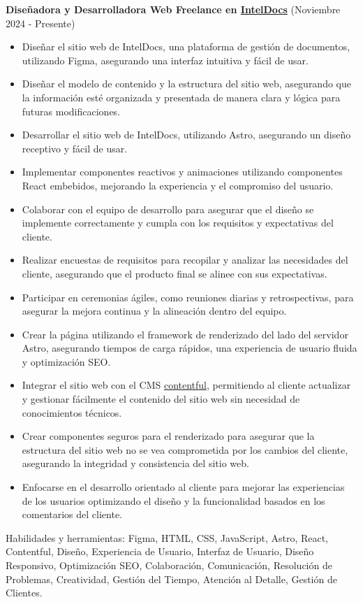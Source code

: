 \vspace*{0.2cm}
\textbf{Diseñadora y Desarrolladora Web Freelance en \href{}{IntelDocs}} (Noviembre 2024 - Presente)
\hfill
\vspace*{0.2cm}
\begin{minipage}{\linewidth}
\begin{itemize}[noitemsep]
    \item Diseñar el sitio web de IntelDocs, una plataforma de gestión de documentos, utilizando Figma, asegurando una interfaz intuitiva y fácil de usar.
    \item Diseñar el modelo de contenido y la estructura del sitio web, asegurando que la información esté organizada y presentada de manera clara y lógica para futuras modificaciones.
    \item Desarrollar el sitio web de IntelDocs, utilizando Astro, asegurando un diseño receptivo y fácil de usar.
    \item Implementar componentes reactivos y animaciones utilizando componentes React embebidos, mejorando la experiencia y el compromiso del usuario.
    \item Colaborar con el equipo de desarrollo para asegurar que el diseño se implemente correctamente y cumpla con los requisitos y expectativas del cliente.
    \item Realizar encuestas de requisitos para recopilar y analizar las necesidades del cliente, asegurando que el producto final se alinee con sus expectativas.
    \item Participar en ceremonias ágiles, como reuniones diarias y retrospectivas, para asegurar la mejora continua y la alineación dentro del equipo.
    \item Crear la página utilizando el framework de renderizado del lado del servidor Astro, asegurando tiempos de carga rápidos, una experiencia de usuario fluida y optimización SEO.
    \item Integrar el sitio web con el CMS \href{https://www.contentful.com/}{contentful}, permitiendo al cliente actualizar y gestionar fácilmente el contenido del sitio web sin necesidad de conocimientos técnicos.
    \item Crear componentes seguros para el renderizado para asegurar que la estructura del sitio web no se vea comprometida por los cambios del cliente, asegurando la integridad y consistencia del sitio web.
    \item Enfocarse en el desarrollo orientado al cliente para mejorar las experiencias de los usuarios optimizando el diseño y la funcionalidad basados en los comentarios del cliente.
\end{itemize}
\hfill
\end{minipage}
Habilidades y herramientas: Figma, HTML, CSS, JavaScript, Astro, React, Contentful, Diseño, Experiencia de Usuario, Interfaz de Usuario, Diseño Responsivo, Optimización SEO, Colaboración, Comunicación, Resolución de Problemas, Creatividad, Gestión del Tiempo, Atención al Detalle, Gestión de Clientes.

